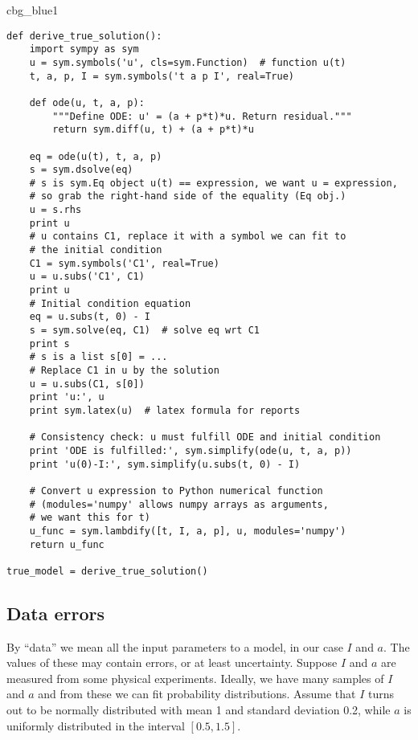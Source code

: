 \documentclass[graybox,sectrefs,envcountresetchap,open=right,final]{svmonodo}
\newenvironment{_cod_tight}[1]{
   \def\FrameCommand{\colorbox{#1}}
   \FrameRule0.6pt\MakeFramed {\FrameRestore}\vskip3mm}
   {\vskip0mm\endMakeFramed}
\newenvironment{cod}[1]{
\bgroup\rmfamily
\fboxsep=0mm\relax
\begin{_cod_tight}{#1}
\list{}{\parsep=-2mm\parskip=0mm\topsep=0pt\leftmargin=2mm
\rightmargin=2\leftmargin\leftmargin=4pt\relax}
\item\relax}
{\endlist\end{_cod_tight}\egroup}
\begin{document}
\begin{cod}{cbg_blue1}\begin{Verbatim}[numbers=none,fontsize=\fontsize{9pt}{9pt},baselinestretch=0.95,xleftmargin=2mm]
def derive_true_solution():
    import sympy as sym
    u = sym.symbols('u', cls=sym.Function)  # function u(t)
    t, a, p, I = sym.symbols('t a p I', real=True)

    def ode(u, t, a, p):
        """Define ODE: u' = (a + p*t)*u. Return residual."""
        return sym.diff(u, t) + (a + p*t)*u

    eq = ode(u(t), t, a, p)
    s = sym.dsolve(eq)
    # s is sym.Eq object u(t) == expression, we want u = expression,
    # so grab the right-hand side of the equality (Eq obj.)
    u = s.rhs
    print u
    # u contains C1, replace it with a symbol we can fit to
    # the initial condition
    C1 = sym.symbols('C1', real=True)
    u = u.subs('C1', C1)
    print u
    # Initial condition equation
    eq = u.subs(t, 0) - I
    s = sym.solve(eq, C1)  # solve eq wrt C1
    print s
    # s is a list s[0] = ...
    # Replace C1 in u by the solution
    u = u.subs(C1, s[0])
    print 'u:', u
    print sym.latex(u)  # latex formula for reports

    # Consistency check: u must fulfill ODE and initial condition
    print 'ODE is fulfilled:', sym.simplify(ode(u, t, a, p))
    print 'u(0)-I:', sym.simplify(u.subs(t, 0) - I)

    # Convert u expression to Python numerical function
    # (modules='numpy' allows numpy arrays as arguments,
    # we want this for t)
    u_func = sym.lambdify([t, I, a, p], u, modules='numpy')
    return u_func

true_model = derive_true_solution()
\end{Verbatim}
\end{cod}
\noindent

\subsection{Data errors}


By ``data'' we mean all the input parameters to a model, in our case
$I$ and $a$. The values of these may contain errors, or at least
uncertainty. Suppose $I$ and $a$ are measured from some physical
experiments. Ideally, we have many samples of $I$ and $a$ and
from these we can fit probability distributions. Assume that $I$
turns out to be normally distributed with mean 1 and standard deviation 0.2,
while $a$ is uniformly distributed in the interval $[0.5, 1.5]$.
\end{document}
